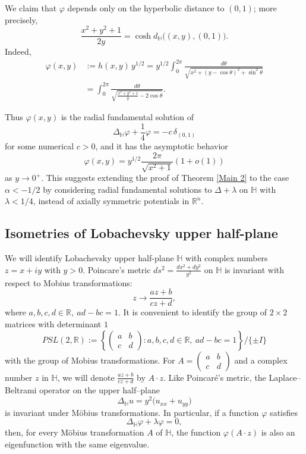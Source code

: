 \documentclass{article}
\newcommand{\Hh}{\mathbb{H}}
\begin{document}
We claim that $\varphi$ depends only on the hyperbolic distance to
$(0,1)$; more precisely,
\[
\frac{x^2+y^2+1}{2y}= \cosh d_\mathbb{H}\big((x,y),(0,1)\big).
\]
Indeed,
\begin{equation} \label{eq:radial}
\begin{aligned}
\varphi(x,y)
  &:= h(x,y)\,y^{1/2}
   = y^{1/2}\int_0^{2\pi}
       \frac{d\theta}{\sqrt{x^2 + (y-\cos\theta)^2 + \sin^2\theta}} \\
  &= \int_0^{2\pi}
       \frac{d\theta}{\sqrt{\frac{x^2 + y^2 + 1}{y} - 2\cos\theta}}.
\end{aligned}
\end{equation}

Thus $\varphi(x,y)$ is the radial fundamental solution of
\[
\Delta_\mathbb{H} \varphi + \frac{1}{4} \varphi = -c \,\delta_{(0,1)}
\]
for some numerical $c>0$, and it has the asymptotic behavior
\[
\varphi(x,y)= y^{1/2}\frac{2\pi}{\sqrt{x^2+1}}(1+o(1))
\]
as $y\to 0^+$. This suggests extending
the proof of Theorem \ref{Main 2} to the case $\alpha < -1/2$ by
considering radial fundamental solutions to $\Delta +\lambda$ on
$\mathbb{H}$ with $\lambda<1/4$, instead of axially symmetric
potentials in $\mathbb{R}^n$.


\subsection*{Isometries of Lobachevsky upper half-plane}
We will identify Lobachevsky upper half-plane $\Hh$ with complex numbers $z=x+iy$ with $y>0$. Poincare's metric $ds^2=\frac{dx^2+dy^2}{y^2}$ on $\Hh$ is invariant with respect to 
Mobius transformations:
$$z\to \frac{az+b}{cz+d},$$
where $a,b,c,d \in \mathbb{R},\ ad - bc = 1$. It is convenient to identify the group of $2\times2$ matrices with determinant $1$
\[
PSL(2,\mathbb{R}):=
\left\{
\begin{pmatrix}
a & b\\
c & d
\end{pmatrix}
: a,b,c,d \in \mathbb{R},\ ad - bc = 1
\right\}/ \{\pm I\}
\]
 with the group of Mobius transformations. For $A=\begin{pmatrix}
a & b\\
c & d
\end{pmatrix}$ and a complex number $z$ in $\Hh$, we will denote $\frac{az+b}{cz+d}$ by $A\cdot z$. 
Like Poincar\'e's metric, the Laplace--Beltrami operator on the upper half--plane
\[
\Delta_{\mathbb H} u = y^{2}\bigl(u_{xx} + u_{yy}\bigr)
\]
is invariant under M\"obius transformations. In particular, if a function
\(\varphi\) satisfies
\[
\Delta_{\mathbb H} \varphi + \lambda\varphi = 0,
\]
then, for every M\"obius transformation \(A\) of \(\mathbb H\), the function
\(\varphi(A\cdot z)\) is also an eigenfunction with the same eigenvalue.
\end{document}
